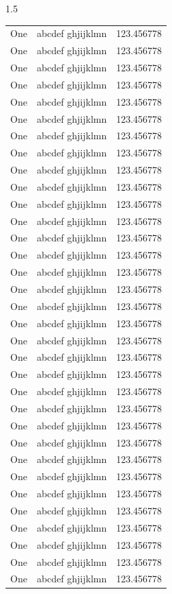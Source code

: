 \begin{spacing}{1.5}
\begin{longtable}{|l|l|l|}
	One & abcdef ghjijklmn & 123.456778 \\
	One & abcdef ghjijklmn & 123.456778 \\
	One & abcdef ghjijklmn & 123.456778 \\
	One & abcdef ghjijklmn & 123.456778 \\
	One & abcdef ghjijklmn & 123.456778 \\
	One & abcdef ghjijklmn & 123.456778 \\
	One & abcdef ghjijklmn & 123.456778 \\
	One & abcdef ghjijklmn & 123.456778 \\
	One & abcdef ghjijklmn & 123.456778 \\
	One & abcdef ghjijklmn & 123.456778 \\
	One & abcdef ghjijklmn & 123.456778 \\
	One & abcdef ghjijklmn & 123.456778 \\
	One & abcdef ghjijklmn & 123.456778 \\
	One & abcdef ghjijklmn & 123.456778 \\
	One & abcdef ghjijklmn & 123.456778 \\
	One & abcdef ghjijklmn & 123.456778 \\
	One & abcdef ghjijklmn & 123.456778 \\
	One & abcdef ghjijklmn & 123.456778 \\
	One & abcdef ghjijklmn & 123.456778 \\
	One & abcdef ghjijklmn & 123.456778 \\
	One & abcdef ghjijklmn & 123.456778 \\
	One & abcdef ghjijklmn & 123.456778 \\
	One & abcdef ghjijklmn & 123.456778 \\
	One & abcdef ghjijklmn & 123.456778 \\
	One & abcdef ghjijklmn & 123.456778 \\
	One & abcdef ghjijklmn & 123.456778 \\
	One & abcdef ghjijklmn & 123.456778 \\
	One & abcdef ghjijklmn & 123.456778 \\
	One & abcdef ghjijklmn & 123.456778 \\
	One & abcdef ghjijklmn & 123.456778 \\
	One & abcdef ghjijklmn & 123.456778 \\
	One & abcdef ghjijklmn & 123.456778 \\
	One & abcdef ghjijklmn & 123.456778 \\

\end{longtable}
\end{spacing}
